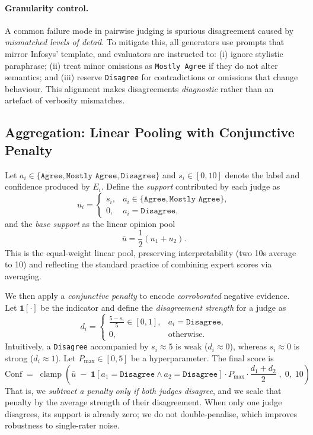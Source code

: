 \paragraph{Granularity control.}
A common failure mode in pairwise judging is spurious disagreement caused
by \emph{mismatched levels of detail}. To mitigate this, all generators
use prompts that mirror Infosys’ template, and evaluators are instructed
to: (i) ignore stylistic paraphrase; (ii) treat minor omissions as
\texttt{Mostly Agree} if they do not alter semantics; and (iii) reserve
\texttt{Disagree} for contradictions or omissions that change behaviour.
This alignment makes disagreements \emph{diagnostic} rather than an
artefact of verbosity mismatches.

\subsection{Aggregation: Linear Pooling with Conjunctive Penalty}
Let $a_i\in\{\texttt{Agree},\texttt{Mostly Agree},\texttt{Disagree}\}$
and $s_i\in[0,10]$ denote the label and confidence produced by $E_i$.
Define the \emph{support} contributed by each judge as
\[
u_i=\begin{cases}
s_i, & a_i\in\{\texttt{Agree},\texttt{Mostly Agree}\},\\
0,   & a_i=\texttt{Disagree},
\end{cases}
\]
and the \emph{base support} as the linear opinion pool
\[
\bar{u}=\frac{1}{2}(u_1+u_2).
\]
This is the equal-weight linear pool, preserving interpretability (two
10s average to 10) and reflecting the standard practice of combining
expert scores via averaging.

We then apply a \emph{conjunctive penalty} to encode \emph{corroborated}
negative evidence. Let $\mathbf{1}[\cdot]$ be the indicator and define
the \emph{disagreement strength} for a judge as
\[
d_i=\begin{cases}
\frac{5-s_i}{5}\in[0,1], & a_i=\texttt{Disagree},\\
0,                       & \text{otherwise.}
\end{cases}
\]
 Intuitively, a \texttt{Disagree} accompanied by $s_i\approx 5$ is weak
($d_i\approx0$), whereas $s_i\approx 0$ is strong ($d_i\approx 1$).
Let $P_{\max}\in[0,5]$ be a hyperparameter. The final score is
\small
\[
\text{Conf} \;=\; \operatorname{clamp}\!\left(
\bar{u}\;-\; \mathbf{1}[a_1=\texttt{Disagree}\wedge a_2=\texttt{Disagree}]
\cdot P_{\max}\cdot \frac{d_1+d_2}{2}\;,\;0,\;10\right)
\]
\normalsize
That is, we \emph{subtract a penalty only if both judges disagree}, and
we scale that penalty by the average strength of their disagreement.
When only one judge disagrees, its support is already zero; we do not
double-penalise, which improves robustness to single-rater noise.


